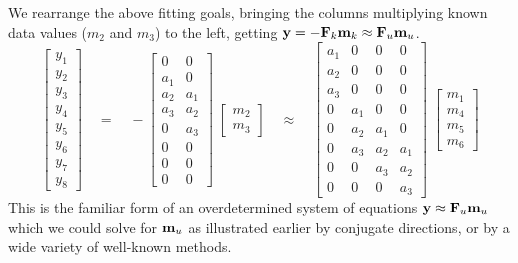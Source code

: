 We rearrange the above fitting goals,
bringing the columns multiplying known data values
($m_2$ and $m_3$) to the left,
getting $\bold y =-\bold F_k \bold m_k \approx \bold F_u \bold m_u$.
\begin{equation} 
\left[ 
\begin{array}{c}
  y_1 \\ 
  y_2 \\ 
  y_3 \\ 
  y_4 \\ 
  y_5 \\ 
  y_6 \\ 
  y_7 \\ 
  y_8
  \end{array} \right] 
\quad = \quad  -
\left[ 
\begin{array}{cc}
   0   & 0    \\
   a_1 & 0    \\
   a_2 & a_1  \\
   a_3 & a_2  \\
   0   & a_3  \\
   0   & 0    \\
   0   & 0    \\
   0   & 0    
  \end{array} \right] 
\; \left[ 
\begin{array}{c}
  m_2 \\ 
  m_3 
  \end{array} \right]
\quad \approx \quad
\left[ 
\begin{array}{cccc}
  a_1  & 0   & 0   & 0   \\
  a_2  & 0   & 0   & 0   \\
  a_3  & 0   & 0   & 0   \\
  0    & a_1 & 0   & 0   \\
  0    & a_2 & a_1 & 0   \\
  0    & a_3 & a_2 & a_1 \\
  0    & 0   & a_3 & a_2 \\
  0    & 0   & 0   & a_3 
  \end{array} \right] 
\; \left[ 
\begin{array}{c}
  m_1 \\ 
  m_4 \\ 
  m_5 \\ 
  m_6
  \end{array} \right]
\label{eqn:wristpain}
\end{equation}
This is the familiar form of an overdetermined system of equations
$\bold y \approx \bold F_u \bold m_u$
which we could solve
for $\bold m_u$
as illustrated earlier by conjugate directions,
or by a wide variety of well-known methods.

